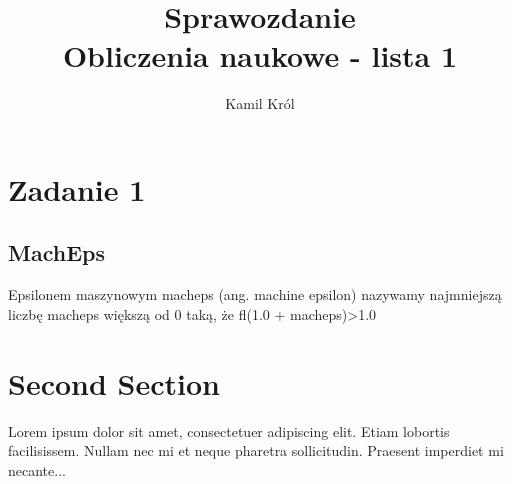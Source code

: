 \documentclass[]{article}
\title{
	Sprawozdanie \\
	\large 
	Obliczenia naukowe - lista 1}
\author{Kamil Król}
\date{}
\begin{document}
	
	\maketitle
	
	\section{Zadanie 1}
	
	\subsection{MachEps}
	
	Epsilonem maszynowym macheps (ang. machine epsilon) nazywamy najmniejszą liczbę macheps większą od 0 taką, że fl(1.0 + macheps)\textgreater 1.0
	
	
	
	\section{Second Section}
	
	Lorem ipsum dolor sit amet, consectetuer adipiscing elit.  
	Etiam lobortis facilisissem.  Nullam nec mi et neque pharetra 
	sollicitudin.  Praesent imperdiet mi necante...
	
\end{document}
